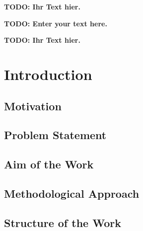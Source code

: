 \documentclass{vutinfth} %
\newcommand{\todo}[1]{{\color{red}\textbf{TODO: {#1}}}} %
\begin{document}
\frontmatter %

\addstatementpage

\begin{danksagung*}
\todo{Ihr Text hier.}
\end{danksagung*}

\begin{acknowledgements*}
\todo{Enter your text here.}
\end{acknowledgements*}

\begin{kurzfassung}
\todo{Ihr Text hier.}
\end{kurzfassung}

\begin{abstract}
\todo{Enter your text here.}
\end{abstract}


\tableofcontents %

\mainmatter

\chapter{Introduction}

\section{Motivation}

\section{Problem Statement}

\section{Aim of the Work}

\section{Methodological Approach}

\section{Structure of the Work} %
\end{document}
